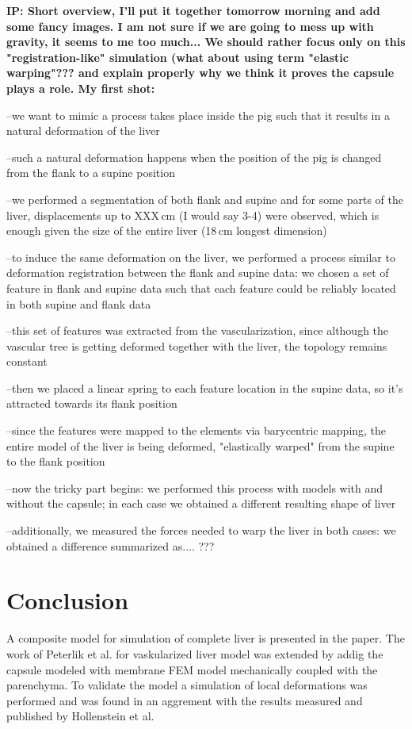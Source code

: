 \documentclass{llncs}
\newcommand{\IP}[1]{{\color{cyan}\textbf{IP: #1}}}
\begin{document}
\IP{Short overview, I'll put it together tomorrow morning and add some fancy images. I am not sure if we are going to mess up 
with gravity, it seems to me too much... We should rather focus only on this "registration-like" simulation (what about 
using term "elastic warping"??? and explain properly why we think it proves the capsule plays a role. My first shot:}

--we want to mimic a process takes place inside the pig such that it results in a natural deformation of the liver

--such a natural deformation happens when the position of the pig is changed from the flank to a supine position

--we performed a segmentation of both flank and supine and for some parts of the liver, displacements up to XXX\,cm  (I would say 3-4) 
were observed, which is enough given the size of the entire liver (18\,cm longest dimension)

--to induce the same deformation on the liver, we performed a process similar to deformation registration between the flank and supine 
data: we chosen a set of feature in flank and supine data such that each feature could be reliably located in both supine and flank 
data

--this set of features was extracted from the vascularization, since although the vascular tree is getting deformed together with the liver, 
the topology remains constant

--then we placed a linear spring to each feature location in the supine data, so it's attracted towards its flank position

--since the features were mapped to the elements via barycentric mapping, the entire model of the liver is being deformed, "elastically warped" from the 
supine to the flank position


--now the tricky part begins: we performed this process with models with and without the capsule; in each case we obtained 
a different resulting shape of liver

--additionally, we measured the forces needed to warp the liver in both cases: we obtained a difference summarized as.... ???



\section{Conclusion} %

A composite model for simulation of complete liver is presented in the
paper. The work of Peterlik et al. for vaskularized liver model was
extended by addig the capsule modeled with membrane FEM model mechanically
coupled with the parenchyma. To validate the model a simulation of local
deformations was performed and was found in an aggrement with the results
measured and published by Hollenstein et al.
\end{document}
